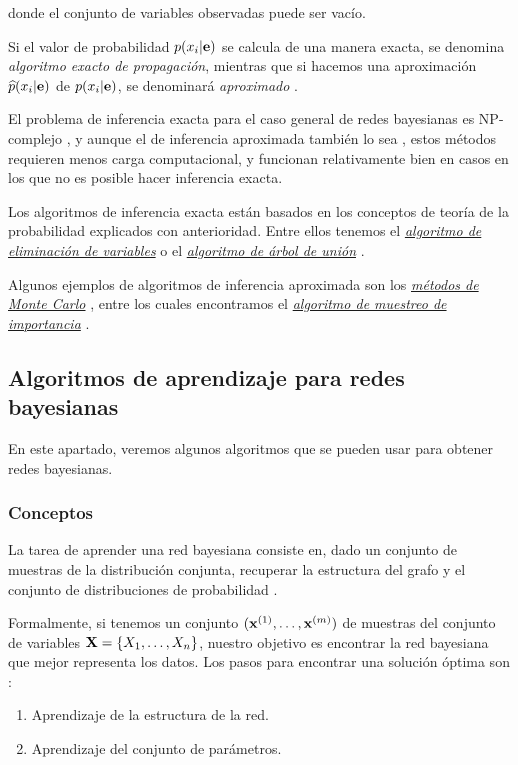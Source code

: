 donde el conjunto de variables observadas puede ser vacío.

Si el valor de probabilidad $p(x_i|{\bf e})$ se calcula de una manera exacta, se denomina {\em algoritmo exacto 
de propagación}, mientras que si hacemos una aproximación $\widehat p(x_i|{\bf e})$ de $p(x_i|{\bf e})$, se 
denominará {\em aproximado} \cite{Cano2004}.

El problema de inferencia exacta para el caso general de redes bayesianas es NP-complejo \cite{Cooper}, y 
aunque el de inferencia aproximada también lo sea \cite{Dagum}, estos métodos requieren menos 
carga computacional, y funcionan relativamente bien en casos en los que no es posible hacer inferencia exacta.

Los algoritmos de inferencia exacta \cite {ECastillo, pearl88} están basados en los conceptos de teoría 
de la probabilidad explicados con anterioridad. Entre ellos tenemos el \href{https://ermongroup.github.io/cs228-notes/inference/ve/}{\em 
algoritmo de eliminación de variables} o el \href{https://mjtsai1974.github.io/DevBlog/2018/10/14/bayesian-ml-clique-tree-construction/}{\em 
algoritmo de árbol de unión} \cite{clique-tree}. 

Algunos ejemplos de algoritmos de inferencia aproximada son los 
\href{http://www.sc.ehu.es/sbweb/fisica_/numerico/montecarlo/montecarlo.html}{\em métodos de Monte 
Carlo} \cite{Cano2004}, entre los cuales encontramos el \href{https://github.com/topics/importance-sampling}{\em algoritmo de muestreo de importancia} \cite{martinez}. 

\subsection{Algoritmos de aprendizaje para redes bayesianas}
En este apartado, veremos algunos algoritmos que se pueden usar para obtener redes bayesianas.
\subsubsection{Conceptos}
    
La tarea de aprender una red bayesiana consiste en, dado un conjunto de muestras de la distribución 
conjunta, recuperar la estructura del grafo y el conjunto de distribuciones de probabilidad \cite{different-algorithmic-schemes}.
    
Formalmente, si tenemos un conjunto $({\bf x}^{(1)}, \dots, {\bf x}^{(m)})$ de muestras del conjunto de variables 
${\bf X} = \{X_1, \dots, X_n\}$, nuestro objetivo es encontrar la red bayesiana que mejor representa los datos. Los 
pasos para encontrar una solución óptima son \cite{Cano2004}: 
\begin{enumerate}
    \item Aprendizaje de la estructura de la red.
    \item Aprendizaje del conjunto de parámetros. 
\end{enumerate}

